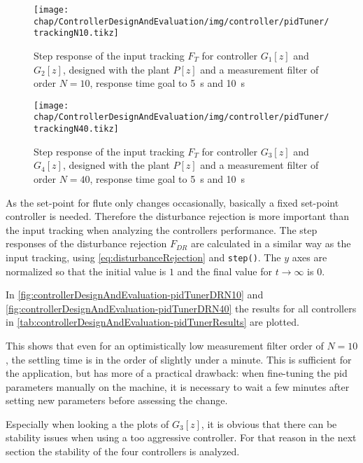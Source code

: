 \begin{figure}[tb]
	\centering
	\texttt{[image: chap/ControllerDesignAndEvaluation/img/controller/pidTuner/trackingN10.tikz]}
	\caption{Step response of the input tracking $F_T$ for controller $G_1[z]$ and $G_2[z]$, designed with the plant $P[z]$ and a measurement filter of order $N=10$, response time goal to \SI{5}{\second} and \SI{10}{\second}}
	\label{fig:controllerDesignAndEvaluation-pidTunerITN10}
\end{figure}

\begin{figure}[tb]
	\centering
	\texttt{[image: chap/ControllerDesignAndEvaluation/img/controller/pidTuner/trackingN40.tikz]}
	\caption{Step response of the input tracking $F_T$ for controller $G_3[z]$ and $G_4[z]$, designed with the plant $P[z]$ and a measurement filter of order $N=40$, response time goal to \SI{5}{\second} and \SI{10}{\second}}
	\label{fig:controllerDesignAndEvaluation-pidTunerITN40}
\end{figure}

As the set-point for \gls{flute} only changes occasionally, basically a fixed set-point controller is needed. Therefore the disturbance rejection is more important than the input tracking when analyzing the controllers performance. The step responses of the disturbance rejection $F_{DR}$ are calculated in a similar way as the input tracking, using \autoref{eq:disturbanceRejection} and \texttt{step()}. The $y$ axes are normalized so that the initial value is $1$ and the final value for $t \rightarrow \infty$ is $0$.

In \autoref{fig:controllerDesignAndEvaluation-pidTunerDRN10} and \autoref{fig:controllerDesignAndEvaluation-pidTunerDRN40} the results for all controllers in \autoref{tab:controllerDesignAndEvaluation-pidTunerResults} are plotted.

This shows that even for an optimistically low measurement filter order of $N=10$, the settling time is in the order of slightly under a minute. This is sufficient for the application, but has more of a practical drawback: when fine-tuning the \gls{pid} parameters manually on the machine, it is necessary to wait a few minutes after setting new parameters before assessing the change.

Especially when looking a the plots of $G_3[z]$, it is obvious that there can be stability issues when using a too aggressive controller. For that reason in the next section the stability of the four controllers is analyzed.

